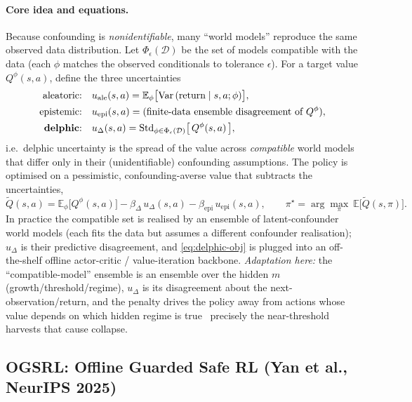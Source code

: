 \documentclass[11pt]{article}
\begin{document}
\paragraph{Core idea and equations.} Because confounding is \emph{nonidentifiable},
many ``world models'' reproduce the same observed data distribution. Let
$\Phi_\epsilon(\mathcal{D})$ be the set of models compatible with the data (each
$\phi$ matches the observed conditionals to tolerance $\epsilon$). For a target
value $Q^\phi(s,a)$, define the three uncertainties
\begin{align}
\text{aleatoric:}\quad & u_{\mathrm{ale}}(s,a) = \mathbb{E}_{\phi}\big[\mathrm{Var}\,(\text{return}\mid s,a;\phi)\big], \\
\text{epistemic:}\quad & u_{\mathrm{epi}}(s,a) = \text{(finite-data ensemble disagreement of }Q^\phi\text{)}, \\
\text{\textbf{delphic}:}\quad & u_{\Delta}(s,a) = \mathrm{Std}_{\phi\in\Phi_\epsilon(\mathcal{D})}\big[\,Q^\phi(s,a)\,\big],
\label{eq:delphic}
\end{align}
i.e.\ delphic uncertainty is the spread of the value across \emph{compatible}
world models that differ only in their (unidentifiable) confounding assumptions.
The policy is optimised on a pessimistic, confounding-averse value that subtracts
the uncertainties,
\begin{equation}
\widetilde{Q}(s,a) = \mathbb{E}_{\phi}\big[Q^\phi(s,a)\big]
- \beta_{\Delta}\,u_{\Delta}(s,a) - \beta_{\mathrm{epi}}\,u_{\mathrm{epi}}(s,a),
\qquad
\pi^\star = \arg\max_{\pi}\ \mathbb{E}\big[\widetilde{Q}(s,\pi)\big].
\label{eq:delphic-obj}
\end{equation}
In practice the compatible set is realised by an ensemble of latent-confounder
world models (each fits the data but assumes a different confounder realisation);
$u_\Delta$ is their predictive disagreement, and \eqref{eq:delphic-obj} is plugged
into an off-the-shelf offline actor-critic / value-iteration backbone.
\emph{Adaptation here:} the ``compatible-model'' ensemble is an ensemble over the
hidden $m$ (growth/threshold/regime), $u_\Delta$ is its disagreement about
the next-observation/return, and the penalty drives the policy away from actions
whose value depends on which hidden regime is true \textemdash\ precisely the
near-threshold harvests that cause collapse.

\subsection{OGSRL: Offline Guarded Safe RL (Yan et al., NeurIPS 2025)}
\end{document}
